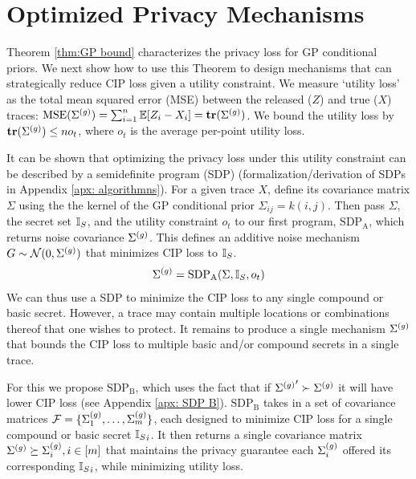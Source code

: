 \section{Optimized Privacy Mechanisms}
\label{sec: algorithms}

Theorem \ref{thm:GP bound} characterizes the privacy loss for GP conditional priors. We next show how to use this Theorem to design mechanisms that can strategically reduce CIP loss given a utility constraint. We measure `utility loss' as the total mean squared error (MSE) between the released ($Z$) and true ($X$) traces: $\text{MSE}(\Sigma^{(g)}) = \sum_{i=1}^n {\mathbb E}[Z_i - X_i] = \mathbf{tr}(\Sigma^{(g)})$. We bound the utility loss by $\mathbf{tr}(\Sigma^{(g)}) \leq n o_t$, where $o_t$ is the average per-point utility loss.

It can be shown that optimizing the privacy loss under this utility constraint can be described by a semidefinite program (SDP) (formalization/derivation of SDPs in Appendix \ref{apx: algorithmns}). For a given trace $X$, define its covariance matrix $\Sigma$ using the the kernel of the GP conditional prior $\Sigma_{ij} = k(i,j)$. Then pass $\Sigma$, the secret set ${\mathbb{I}_S}$, and the utility constraint $o_t$ to our first program, $\text{SDP}_\text{A}$, which returns noise covariance $\Sigma^{(g)}$. This defines an additive noise mechanism $G \sim \mathcal{N}(0, \Sigma^{(g)})$ that minimizes CIP loss to ${\mathbb{I}_S}$. 
\begin{align*}
	\Sigma^{(g)} = \text{SDP}_\text{A}(\Sigma, {\mathbb{I}_S}, o_t)
\end{align*} 
We can thus use a SDP to minimize the CIP loss to any single compound or basic secret. However, a trace may contain multiple locations or combinations thereof that one wishes to protect. It remains to produce a single mechanism $\Sigma^{(g)}$ that bounds the CIP loss to multiple basic and/or compound secrets in a single trace. 

For this we propose $\text{SDP}_\text{B}$, which uses the fact that if ${\Sigma^{(g)}}' \succ \Sigma^{(g)}$ it will have lower CIP loss (see Appendix \ref{apx: SDP B}). $\text{SDP}_\text{B}$ takes in a set of covariance matrices $\mathcal{F} = \{\Sigma^{(g)}_1, \dots, \Sigma^{(g)}_m\}$, each designed to minimize CIP loss for a single compound or basic secret ${\mathbb{I}_S}_i$. It then returns a single covariance matrix $\Sigma^{(g)} \succeq \Sigma^{(g)}_i, i \in [m]$ that maintains the privacy guarantee each $\Sigma^{(g)}_i$ offered its corresponding ${\mathbb{I}_S}_i$, while minimizing utility loss. 

